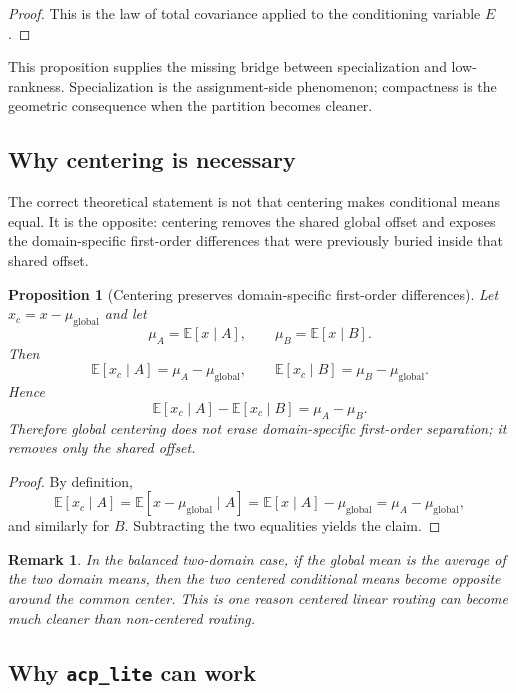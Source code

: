 \documentclass[11pt]{article}
\newtheorem{proposition}{Proposition}
\newtheorem{remark}{Remark}
\begin{document}
\begin{proof}
This is the law of total covariance applied to the conditioning variable $E$.
\end{proof}

This proposition supplies the missing bridge between specialization and low-rankness. Specialization is the assignment-side phenomenon; compactness is the geometric consequence when the partition becomes cleaner.

\subsection{Why centering is necessary}

The correct theoretical statement is not that centering makes conditional means equal. It is the opposite: centering removes the shared global offset and exposes the domain-specific first-order differences that were previously buried inside that shared offset.

\begin{proposition}[Centering preserves domain-specific first-order differences]
Let $x_c = x - \mu_{\mathrm{global}}$ and let
\[
\mu_A = \mathbb{E}[x\mid A], \qquad \mu_B = \mathbb{E}[x\mid B].
\]
Then
\[
\mathbb{E}[x_c \mid A] = \mu_A - \mu_{\mathrm{global}},
\qquad
\mathbb{E}[x_c \mid B] = \mu_B - \mu_{\mathrm{global}}.
\]
Hence
\[
\mathbb{E}[x_c \mid A] - \mathbb{E}[x_c \mid B] = \mu_A - \mu_B.
\]
Therefore global centering does not erase domain-specific first-order separation; it removes only the shared offset.
\end{proposition}

\begin{proof}
By definition,
\[
\mathbb{E}[x_c \mid A]
=
\mathbb{E}[x-\mu_{\mathrm{global}}\mid A]
=
\mathbb{E}[x\mid A]-\mu_{\mathrm{global}}
=
\mu_A-\mu_{\mathrm{global}},
\]
and similarly for $B$. Subtracting the two equalities yields the claim.
\end{proof}

\begin{remark}
In the balanced two-domain case, if the global mean is the average of the two domain means, then the two centered conditional means become opposite around the common center. This is one reason centered linear routing can become much cleaner than non-centered routing.
\end{remark}

\subsection{Why \texttt{acp\_lite} can work}
\end{document}
